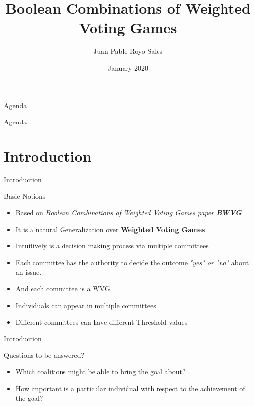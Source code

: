 \documentclass{beamer}
\title{Boolean Combinations of Weighted Voting Games}
\author{Juan Pablo Royo Sales}
\institute{Universitat Politècnica de Catalunya}
\date{January 2020}
\begin{document}
\begin{frame}
\titlepage
\end{frame}
  
\begin{frame}[fragile]{Agenda}
  \tableofcontents
\end{frame}

\begin{frame}[fragile]{Agenda}
  \section{Introduction}
  \tableofcontents[currentsection]
\end{frame}

  
\begin{frame}[fragile]{Introduction}
  \begin{block}{Basic Notions}
    \begin{itemize}
      \item Based on \textit{Boolean Combinations of Weighted Voting Games paper} \textit{\textbf{BWVG}}\footnotemark
      \item It is a natural Generalization over \textbf{Weighted Voting Games}
      \item Intuitively is a decision making process via multiple committees
      \item Each committee has the authority to decide the outcome \textit{"yes" or "no"} about an issue.
      \item And each committee is a WVG 
      \item Individuals can appear in multiple committees
      \item Different committees can have different Threshold values
    \end{itemize}
  \end{block}
\end{frame}

\begin{frame}[fragile]{Introduction}
  \begin{block}{Questions to be answered?}
    \begin{itemize}
      \item Which coalitions might be able to bring the goal about?
      \item How important is a particular individual with respect to the achievement of the goal?
    \end{itemize}
  \end{block}
\end{frame}
\end{document}

